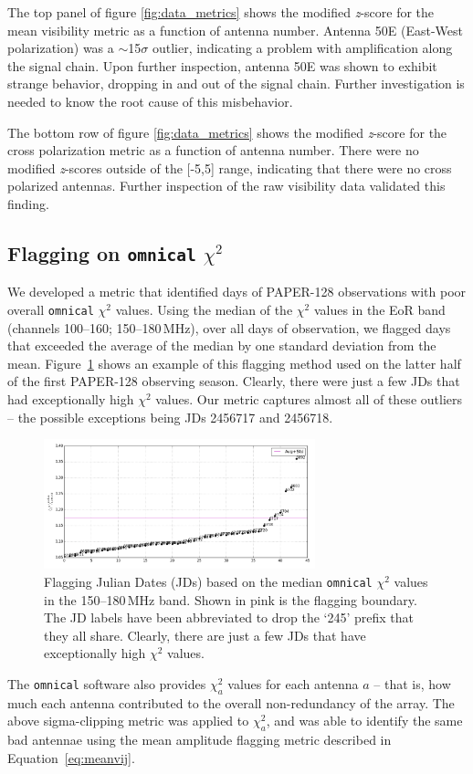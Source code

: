 The top panel of figure \ref{fig:data_metrics} shows the modified \textit{z}-score for
the mean visibility metric as a function of antenna number.
Antenna 50E (East-West polarization) was a $\sim$15$\sigma$ outlier, indicating a problem
with amplification along the signal chain. Upon further inspection,
antenna 50E was shown to exhibit strange behavior, dropping in and out of the signal chain. Further
investigation is needed to know the root cause of this misbehavior. 

The bottom row of figure \ref{fig:data_metrics} shows the modified \textit{z}-score for the cross
polarization metric as a function of antenna number. There were no modified
\textit{z}-scores outside of the [-5,5] range, indicating that there were no cross polarized
antennas. Further inspection of the raw visibility data validated this finding.

\subsection{Flagging on {\tt omnical} $\chi^2$}

We developed a metric that identified days of PAPER-128 observations with poor overall {\tt omnical} $\chi^2$ values. Using the median of the $\chi^2$ values in the EoR band (channels 100--160; 150--180\,MHz), over all days of observation, we flagged days that exceeded the average of the median by one standard deviation from the mean. Figure~\ref{fig:data_chisq_flagging} shows an example of this flagging method used on the latter half of the first PAPER-128 observing season. Clearly, there were just a few JDs that had exceptionally high $\chi^2$ values. Our metric captures almost all of these outliers -- the possible exceptions being JDs 2456717 and 2456718.

\begin{figure}
\centering
\includegraphics[width=0.7\textwidth]{chapters/data_processing/figures/chisq_flagging.png}
\caption[Flagging Julian Dates based on the median {\tt omnical} $\chi^2$ values in the 150--180\,MHz band.]{Flagging Julian Dates (JDs) based on the median {\tt omnical} $\chi^2$ values in the 150--180\,MHz band. Shown in pink is the flagging boundary. The JD labels have been abbreviated to drop the `245' prefix that they all share. Clearly, there are just a few JDs that have exceptionally high $\chi^2$ values.}
\label{fig:data_chisq_flagging}
\end{figure}

The {\tt omnical} software also provides $\chi^2_a$ values for each antenna $a$ -- that is, how much each antenna contributed to the overall non-redundancy of the array. The above sigma-clipping metric was applied to $\chi^2_a$, and was able to identify the same bad antennae using the mean amplitude flagging metric described in Equation~\ref{eq:meanvij}.
